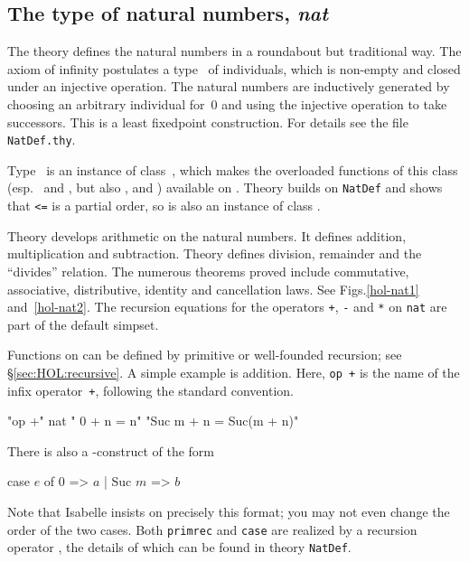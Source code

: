 \subsection{The type of natural numbers, \textit{nat}}

The theory  defines the natural numbers in a roundabout but
traditional way.  The axiom of infinity postulates a type~ of
individuals, which is non-empty and closed under an injective operation.  The
natural numbers are inductively generated by choosing an arbitrary individual
for~0 and using the injective operation to take successors.  This is a least
fixedpoint construction.  For details see the file \texttt{NatDef.thy}.

Type~ is an instance of class~, which makes the
overloaded functions of this class (esp.\ \cdx{<} and \cdx{<=}, but also
,  and ) available on .  Theory
 builds on \texttt{NatDef} and shows that {\tt<=} is a partial order,
so  is also an instance of class .

Theory  develops arithmetic on the natural numbers.  It defines
addition, multiplication and subtraction.  Theory  defines
division, remainder and the ``divides'' relation.  The numerous theorems
proved include commutative, associative, distributive, identity and
cancellation laws.  See Figs.\ts\ref{hol-nat1} and~\ref{hol-nat2}.  The
recursion equations for the operators \texttt{+}, \texttt{-} and \texttt{*} on
\texttt{nat} are part of the default simpset.

Functions on  can be defined by primitive or well-founded recursion;
see \S\ref{sec:HOL:recursive}.  A simple example is addition.
Here, \texttt{op +} is the name of the infix operator~\texttt{+}, following
the standard convention.
\begin{ttbox}
 "op +" nat 
  "    0 + n = n"
  "Suc m + n = Suc(m + n)"
\end{ttbox}
There is also a -construct
of the form
\begin{ttbox}
case \(e\) of 0 => \(a\) | Suc \(m\) => \(b\)
\end{ttbox}
Note that Isabelle insists on precisely this format; you may not even change
the order of the two cases.
Both \texttt{primrec} and \texttt{case} are realized by a recursion operator
, the details of which can be found in theory \texttt{NatDef}.

